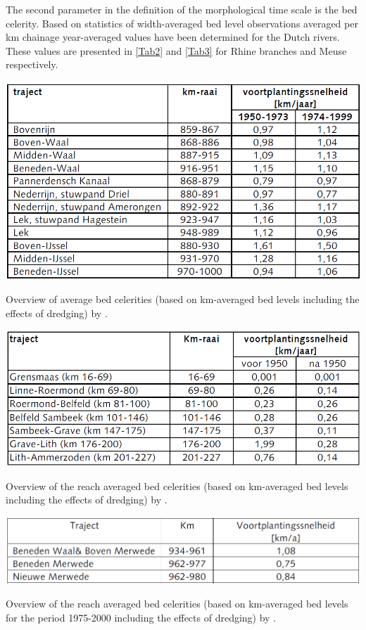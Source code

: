 The second parameter in the definition of the morphological time scale is the bed celerity.
Based on statistics of width-averaged bed level observations averaged per km chainage year-averaged values have been determined \citep{RIZA2005} for the Dutch rivers.
These values are presented in \autoref{Tab2} and \autoref{Tab3} for Rhine branches and Meuse respectively.

\begin{table}
\includegraphics[width=\columnwidth]{figures/Tab2.png}
\caption{Overview of average bed celerities (based on km-averaged bed levels including the effects of dredging) by \citet{RIZA2005}.}
\label{Tab2Again}
\end{table}

\begin{table}
\includegraphics[width=\columnwidth]{figures/Tab3.png}
\caption{Overview of the reach averaged bed celerities (based on km-averaged bed levels including the effects of dredging) by \citet{Waterdienst2008}.}
\label{Tab3Again}
\end{table}

\begin{table}
\includegraphics[width=\columnwidth]{figures/Tab4.png}
\caption{Overview of the reach averaged bed celerities (based on km-averaged bed levels for the period 1975-2000 including the effects of dredging) by \citet{RIZA2007}.}
\label{Tab4}
\end{table}

